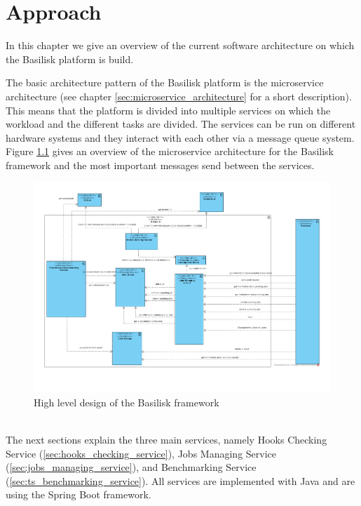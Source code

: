\chapter{Approach}
\label{ch:approach}

In this chapter we give an overview of the current software architecture on which the Basilisk platform is build.

The basic architecture pattern of the Basilisk platform is the microservice architecture (see chapter \ref{sec:microservice_architecture} for a short description). 
This means that the platform is divided into multiple services on which the workload and the different tasks are divided.
The services can be run on different hardware systems and they interact with each other via a message queue system.
\\


Figure \ref{fig:basilisk_high_level_design} gives an overview of the microservice architecture for the Basilisk framework and the most important messages send between the services.
\begin{figure}[tbph]
	\centering
	\includegraphics[width=1.1\textwidth]{figures/basilisk_high_level_design.pdf}
	\caption{High level design of the Basilisk framework}
	\label{fig:basilisk_high_level_design}
\end{figure}
\\

The next sections explain the three main services, namely Hooks Checking Service (\ref{sec:hooks_checking_service}), Jobs Managing Service (\ref{sec:jobs_managing_service}), and \ts{} Benchmarking Service (\ref{sec:ts_benchmarking_service}).
All services are implemented with Java and are using the Spring Boot framework.

